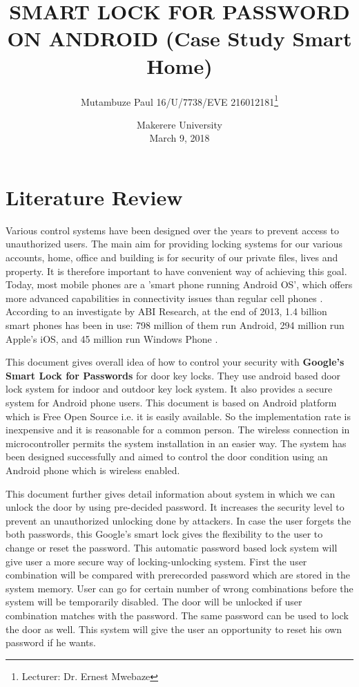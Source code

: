 \documentclass[options]{article}
\title{SMART LOCK FOR PASSWORD ON ANDROID  (Case Study Smart Home)}
\author{Mutambuze Paul  16/U/7738/EVE  216012181\thanks{Lecturer: Dr. Ernest Mwebaze}}\newpage
\date{%
    Makerere University\\%
    March 9, 2018
}
\begin{document}
\begin{titlepage}
\maketitle
\end{titlepage}

\newpage
{} 
\section{\textbf{Literature Review}}
Various control systems have been designed over the years to prevent access to unauthorized users.
The main aim for providing locking systems for our various accounts, home, office and building is for security of
our private files, lives and property. It is therefore important to have convenient way of achieving 
this goal. Today, most mobile phones are a 'smart phone running Android OS', which offers more 
advanced capabilities in connectivity issues than regular cell phones \cite{key:foo}. According to an investigate by ABI Research, at the end of 2013, 1.4 billion smart phones has been
  in use: 798 million of them run Android, 294 million run Apple’s iOS, and 45 million run Windows Phone \cite{foo:baz}. 
  
\cite{key:foo}This document gives overall idea of how to control your security with \textbf{ Google’s Smart Lock for Passwords} for door key locks.
They use android based door lock system for indoor and outdoor key lock system. It also provides a secure system for Android
phone users. This document is based on Android platform which is Free Open Source i.e. it is easily available. So the implementation
rate is inexpensive and it is reasonable for a common person. The wireless connection in microcontroller permits the system
installation in an easier way. The system has been designed successfully and aimed to control the door condition using an
Android phone which is wireless enabled.


\cite{key:lee}This document further gives detail information about system in which we can unlock the door by using pre-decided password.
It increases the security level to prevent an unauthorized unlocking done by attackers. In case the user forgets the both
passwords, this Google’s smart lock gives the flexibility to the user to change or reset the password. This automatic password
based lock system will give user a more secure way of locking-unlocking system. First the user combination will be compared
with prerecorded password which are stored in the system memory. User can go for certain number of wrong combinations
before the system will be temporarily disabled. The door will be unlocked if user combination matches with the password.
The same password can be used to lock the door as well. This system will give the user an opportunity to reset his own
password if he wants.
\end{document}
